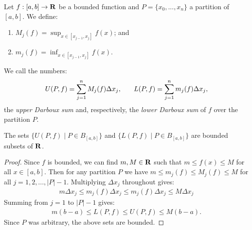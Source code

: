 \documentclass[10pt,twoside,openany]{memoir}
\begin{document}
    \begin{definition}
        Let $f:[a,b] \rightarrow \mathbf{R}$ be a bounded function and $P=\{x_0,...,x_n\}$ a partition of $[a,b]$. We define:
            \begin{enumerate}[label = (\arabic*),itemsep=1pt,topsep=3pt]
                \item $M_j(f) = \sup_{x \in [x_{j-1},x_j]}f(x)$; and
                \item $m_j(f) = \inf_{x \in [x_{j-1},x_j]}f(x)$.
            \end{enumerate}
        We call the numbers:
            \begin{equation*}
            \begin{split}
                U(P,f) = \sum_{j = 1}^n M_j(f)\Delta x_j, \h9\h9 L(P,f) = \sum_{j = 1}^n m_j(f)\Delta x_j, 
            \end{split}
            \end{equation*}
        the \textit{upper Darboux sum} and, respectively, the \textit{lower Darboux sum} of $f$ over the partition $P$.
    \end{definition}

    \begin{proposition}
        The sets $\{U(P,f) \mid P \in B_{[a,b]}\}$ and $\{L(P,f) \mid P \in B_{[a,b]}\}$ are bounded subsets of $\mathbf{R}$.
    \end{proposition}
        \begin{proof}
            Since $f$ is bounded, we can find $m,M \in \mathbf{R}$ such that $m  \leq f(x) \leq M$ for all $x \in [a,b]$. Then for any partition $P$ we have $m \leq m_j(f) \leq M_j(f) \leq M$ for all $j = 1,2,...,|P|-1$. Multiplying $\Delta x_j$ throughout gives:
                \begin{equation*}
                \begin{split}
                    m \Delta x_j \leq  m_j(f)\Delta x_j \leq m_j(f)\Delta x_j \leq M\Delta x_j
                \end{split}
                \end{equation*}
            Summing from $j = 1$ to $|P|-1$ gives:
                \begin{equation*}
                \begin{split}
                    m (b-a) \leq  L(P,f) \leq U(P,f)\leq M(b-a).
                \end{split}
                \end{equation*}
            Since $P$ was arbitrary, the above sets are bounded.
        \end{proof}
\end{document}
